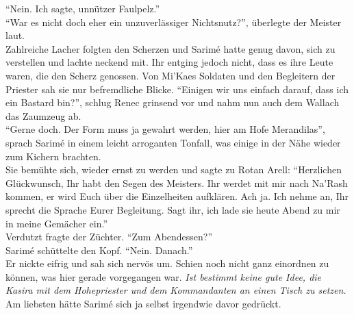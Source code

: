 ``Nein. Ich sagte, unnützer Faulpelz.''\\
``War es nicht doch eher ein unzuverlässiger Nichtsnutz?'', überlegte der Meister laut.\\
Zahlreiche Lacher folgten den Scherzen und Sarimé hatte genug davon, sich zu verstellen und lachte 
neckend mit. Ihr entging jedoch nicht, dass es ihre Leute waren, die den Scherz genossen. Von 
Mi'Kaes Soldaten und den Begleitern der Priester sah sie nur befremdliche Blicke. ``Einigen wir uns 
einfach darauf, dass ich ein Bastard bin?'', schlug Renec grinsend vor und nahm nun auch dem Wallach 
das Zaumzeug ab.\\
``Gerne doch. Der Form muss ja gewahrt werden, hier am Hofe Merandilas'', sprach Sarimé in einem 
leicht arroganten Tonfall, was einige in der Nähe wieder zum Kichern brachten.\\
Sie bemühte sich, wieder ernst zu werden und sagte zu Rotan Arell: ``Herzlichen Glückwunsch, Ihr 
habt den Segen des Meisters. Ihr werdet mit mir nach Na'Rash kommen, er wird Euch über die 
Einzelheiten aufklären. Ach ja. Ich nehme an, Ihr sprecht die Sprache Eurer Begleitung. Sagt ihr, 
ich lade sie heute Abend zu mir in meine Gemächer ein.''\\
Verdutzt fragte der Züchter. ``Zum Abendessen?''\\
Sarimé schüttelte den Kopf. ``Nein. Danach.''\\
Er nickte eifrig und sah sich nervös um. Schien noch nicht ganz einordnen zu können, was hier 
gerade vorgegangen war. \textit{Ist bestimmt keine gute Idee, die Kasira mit dem Hohepriester und 
dem Kommandanten an einen Tisch zu setzen.} Am liebsten hätte Sarimé sich ja selbst irgendwie davor 
gedrückt.\\

